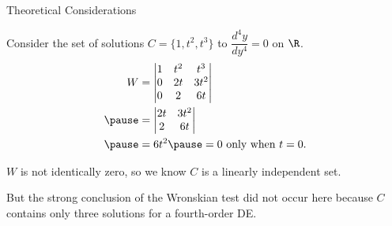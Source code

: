 \documentclass{beamer}
\begin{document}
\begin{frame}{Theoretical Considerations}
\begin{example}
Consider the set of solutions $C=\{1,t^2,t^3\}$ to $\dfrac{d^4y}{dy^4}=0$ on $\R$.\pause
\begin{equation*}
\begin{aligned}
W &=
\begin{vmatrix}
1 & t^2 & t^3  \\
0 & 2t  & 3t^2 \\
0 & 2   & 6t   \\
\end{vmatrix}\\\pause
&=
\begin{vmatrix}
2t  & 3t^2 \\
2   & 6t   \\
\end{vmatrix}\\\pause
&=6t^2\pause
=0\text{ only when }t=0.
\end{aligned}
\end{equation*}

\vspace{-3mm}
$W$ is not identically zero, so we know $C$ is a linearly independent set.\pause

But the strong conclusion of the Wronskian test did not occur here because $C$ contains only three solutions for a fourth-order DE\@.
\end{example}
\end{frame}
\end{document}
